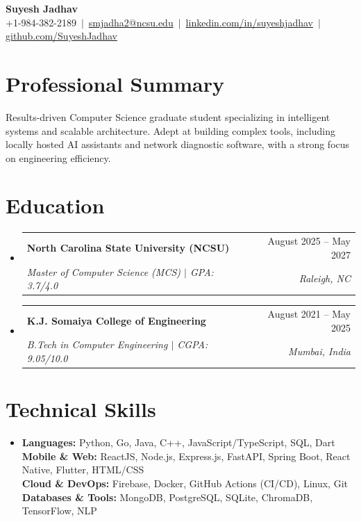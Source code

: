 \documentclass[9pt, letterpaper]{article}
\makeatletter
\newcommand{\outerListStart}{
  \begin{itemize}[
    leftmargin = 0pt,
    label      = {},
    topsep     = 1pt,
    itemsep    = 2pt,
    parsep     = 0pt
  ]
}
\newcommand{\outerListEnd}{\end{itemize}}
\newcommand{\subheading}[4]{
  \item
  \begin{tabular*}{\textwidth}{@{}l@{\extracolsep{\fill}}r@{}}
    \textbf{#1} & \small #2 \\
    \textit{\small #3} & \textit{\small #4}
  \end{tabular*}
  \vspace{-2pt}
}
\makeatother
\begin{document}

\begin{center}
  {\LARGE \textbf{Suyesh Jadhav}}\\[4pt]
  \small
  +1-984-382-2189
  $\,|\,$
  \href{mailto:smjadha2@ncsu.edu}{smjadha2@ncsu.edu}
  $\,|\,$
  \href{https://linkedin.com/in/suyeshjadhav}{linkedin.com/in/suyeshjadhav}
  $\,|\,$
  \href{https://github.com/SuyeshJadhav}{github.com/SuyeshJadhav}
\end{center}

\vspace{1pt}

\section{Professional Summary}

\small
Results-driven Computer Science graduate student specializing in intelligent systems and scalable architecture. Adept at building complex tools, including locally hosted AI assistants and network diagnostic software, with a strong focus on engineering efficiency.

\section{Education}

\outerListStart

  \subheading
    {North Carolina State University (NCSU)}{August 2025 -- May 2027}
    {Master of Computer Science (MCS) $|$ GPA: 3.7/4.0}{Raleigh, NC}

  \subheading
    {K.J. Somaiya College of Engineering}{August 2021 -- May 2025}
    {B.Tech in Computer Engineering $|$ CGPA: 9.05/10.0}{Mumbai, India}

\outerListEnd

\section{Technical Skills}

\outerListStart
  \item \small
  \textbf{Languages:}
    Python, Go, Java, C++, JavaScript/TypeScript, SQL, Dart \\[2pt]
  \textbf{Mobile \& Web:}
    ReactJS, Node.js, Express.js, FastAPI, Spring Boot,
    React Native, Flutter, HTML/CSS \\[2pt]
  \textbf{Cloud \& DevOps:}
    Firebase, Docker, GitHub Actions (CI/CD), Linux, Git \\[2pt]
  \textbf{Databases \& Tools:}
    MongoDB, PostgreSQL, SQLite, ChromaDB, TensorFlow, NLP
\outerListEnd
\end{document}

